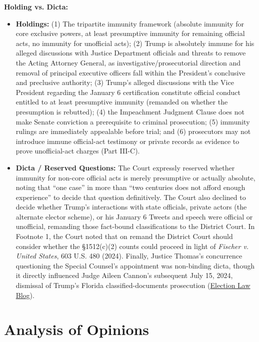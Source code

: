 \documentclass[12pt]{article}
\begin{document}
\textbf{Holding vs. Dicta:}
\begin{itemize}
\item \textbf{Holdings:} (1) The tripartite immunity framework (absolute immunity for core exclusive powers, at least presumptive immunity for remaining official acts, no immunity for unofficial acts); (2) Trump is absolutely immune for his alleged discussions with Justice Department officials and threats to remove the Acting Attorney General, as investigative/prosecutorial direction and removal of principal executive officers fall within the President's conclusive and preclusive authority; (3) Trump's alleged discussions with the Vice President regarding the January 6 certification constitute official conduct entitled to at least presumptive immunity (remanded on whether the presumption is rebutted); (4) the Impeachment Judgment Clause does not make Senate conviction a prerequisite to criminal prosecution; (5) immunity rulings are immediately appealable before trial; and (6) prosecutors may not introduce immune official-act testimony or private records as evidence to prove unofficial-act charges (Part III-C).
\item \textbf{Dicta / Reserved Questions:} The Court expressly reserved whether immunity for non-core official acts is merely presumptive or actually absolute, noting that ``one case'' in more than ``two centuries does not afford enough experience'' to decide that question definitively. The Court also declined to decide whether Trump's interactions with state officials, private actors (the alternate elector scheme), or his January 6 Tweets and speech were official or unofficial, remanding those fact-bound classifications to the District Court. In Footnote 1, the Court noted that on remand the District Court should consider whether the \S 1512(c)(2) counts could proceed in light of \textit{Fischer v. United States}, 603 U.S. 480 (2024). Finally, Justice Thomas's concurrence questioning the Special Counsel's appointment was non-binding dicta, though it directly influenced Judge Aileen Cannon's subsequent July 15, 2024, dismissal of Trump's Florida classified-documents prosecution (\href{https://electionlawblog.org/2024/breaking-judge-cannon-says-appointment-of-special-counsel-was-unconstitutional-dismisses-trump-documents-case/}{Election Law Blog}).
\end{itemize}

\section{Analysis of Opinions}
\end{document}
